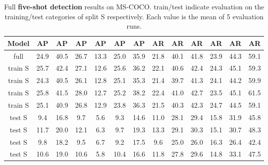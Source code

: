 \documentclass{article}
\newcommand{\coco}{MS-COCO\xspace}
\begin{document}
\begin{table}[h]
\begin{center}
\begin{small}
\begin{tabular}{c|ccc|ccc|ccc|ccc}
Model & AP & AP & AP & AP & AP & AP & AR & AR & AR & AR & AR & AR\\
\hline
full & 24.9 & 40.5 & 26.7 & 13.3 & 25.0 & 35.9 & 21.8 & 40.1 & 41.8 & 23.9 & 44.3 & 59.1 \\
\hline
train S & 25.7 & 42.4 & 27.1 & 12.6 & 25.6 & 36.2 & 22.1 & 40.6 & 42.4 & 24.3 & 45.1 & 59.3 \\
train S & 24.3 & 40.5 & 26.1 & 12.8 & 25.1 & 35.3 & 21.4 & 39.7 & 41.3 & 24.1 & 44.2 & 59.9 \\
train S & 25.8 & 41.5 & 28.0 & 12.7 & 25.2 & 38.2 & 22.4 & 41.0 & 42.7 & 23.5 & 45.1 & 61.5 \\
train S & 25.1 & 40.9 & 26.8 & 12.9 & 23.8 & 36.3 & 21.5 & 40.3 & 42.3 & 24.7 & 44.5 & 59.1 \\
\hline
test S & 9.4 & 16.8 & 9.7 & 5.6 & 9.3 & 14.6 & 11.0 & 28.1 & 29.4 & 15.8 & 31.9 & 45.8 \\
test S & 11.7 & 20.0 & 12.1 & 6.3 & 9.7 & 19.3 & 13.3 & 29.1 & 30.3 & 15.1 & 30.7 & 48.3 \\
test S & 9.8 & 18.2 & 9.5 & 6.7 & 9.2 & 17.5 & 9.6 & 25.0 & 26.0 & 16.3 & 26.4 & 42.4 \\
test S & 10.6 & 19.0 & 10.6 & 5.8 & 10.4 & 16.6 & 11.8 & 27.8 & 29.6 & 14.8 & 33.1 & 47.5
\end{tabular}
\end{small}
\end{center}
\caption{Full \textbf{five-shot detection} results on \coco. train/test indicate evaluation on the training/test categories of split S respectively. Each value is the mean of 5 evaluation runs.}
\vspace{-12pt}
\label{table:extended_five-shot_detection_results}
\end{table}
\end{document}

